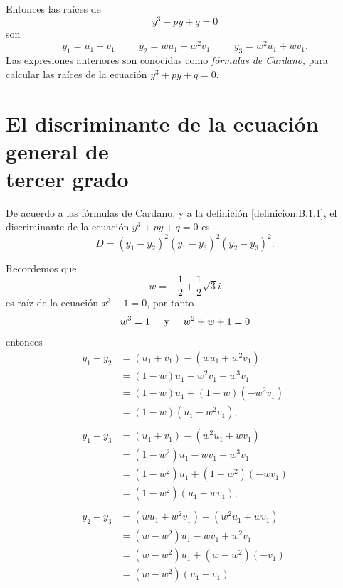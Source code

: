 Entonces las raíces de
$$y^3+py+q=0$$
son
\begin{equation}
    y_1=u_1+v_1 \hspace{1cm} y_2=wu_1+w^2v_1 \hspace{1cm} y_3=w^2u_1+wv_1. \label{APPCOSIPA3}
\end{equation}
Las expresiones anteriores son conocidas como \textit{fórmulas de Cardano}, para calcular las raíces de la ecuación $y^3+py+q=0$.

\newpage
\section[El discriminante de la ecuación general de tercer grado]{El discriminante de la ecuación general de \\ tercer grado}\label{disc_tercergrado}

De acuerdo a las fórmulas de Cardano, y a la definición \ref{definicion:B.1.1}, el discriminante de la ecuación $y^3+py+q=0$ es
$$D=(y_1-y_2)^2(y_1-y_3)^2(y_2-y_3)^2.$$

Recordemos que
$$w=-\frac{1}{2}+\frac{1}{2}\sqrt{3}i$$
es raíz de la ecuación $x^3-1=0$, por tanto
$$w^3=1 \hspace{0.5cm} \text{y} \hspace{0.5cm} w^2+w+1=0$$
entonces
\begin{align*}
    y_1-y_2 &=(u_1+v_1)-\left(wu_1+w^2v_1\right) \\
    &=(1-w)u_1-w^2v_1+w^3v_1 \\
    &=(1-w)u_1+(1-w)\left(-w^2v_1\right) \\
    &=(1-w)\left(u_1-w^2v_1\right), \\
    & \\
    y_1-y_3 &=(u_1+v_1)-\left( w^2u_1+wv_1 \right) \\
    &=\left( 1-w^2 \right) u_1-wv_1+w^3v_1 \\
    &=\left( 1-w^2 \right) u_1+\left( 1-w^2 \right) (-wv_1) \\
    &=\left( 1-w^2 \right) (u_1-wv_1), \\
    & \\
    y_2-y_3 &=\left( wu_1+w^2v_1 \right) - \left( w^2u_1+wv_1 \right) \\
    &=\left( w-w^2 \right) u_1-wv_1+w^2v_1 \\
    &=\left( w-w^2 \right) u_1+\left( w-w^2 \right) (-v_1) \\
    &=\left( w-w^2 \right) (u_1-v_1).
\end{align*}

